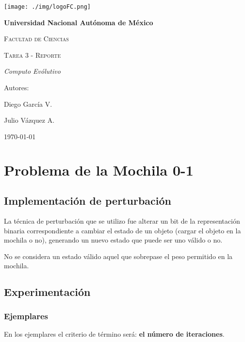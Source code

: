 \documentclass{article}
\begin{document}
\begin{titlepage}
{\texttt{[image: ./img/logoFC.png]}\par}
\vspace{1cm}
\centering
{\bfseries\huge Universidad Nacional Autónoma de México \par}
\vspace{1cm}
{\scshape\huge Facultad de Ciencias \par}
\vspace{2cm}
{\scshape\Huge Tarea 3 - Reporte\par}
\vspace{2cm}
{\itshape\LARGE Computo Evólutivo \par}
\vfill
{\large Autores: \par}
{\large Diego García V. \par}
{\large Julio Vázquez A. \par}
\vfill
{\Large \today \par}
\end{titlepage}

\section*{Problema de la Mochila 0-1}

\subsection*{Implementación de perturbación}

La técnica de perturbación que se utilizo fue alterar un bit de la representación binaria correspondiente a cambiar el estado de un objeto (cargar el objeto en la mochila o no), generando un nuevo estado que puede ser uno válido o no.

No se considera un estado válido aquel que sobrepase el peso permitido en la mochila.

\subsection*{Experimentación}

\subsubsection*{Ejemplares}

En los ejemplares el criterio de término será: \textbf{el número de iteraciones}.
\end{document}
